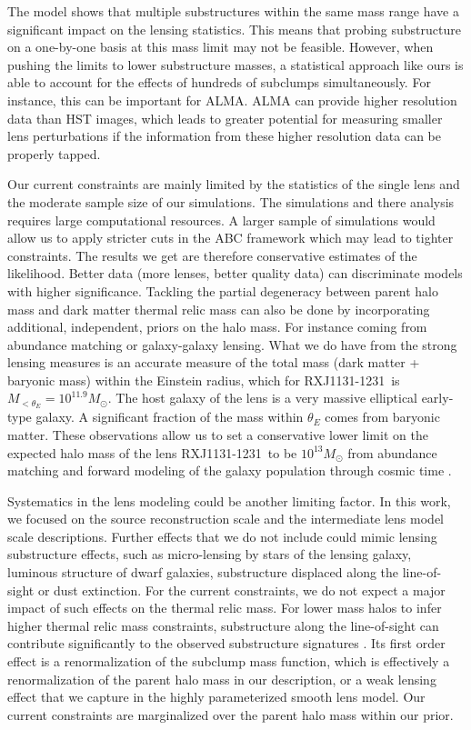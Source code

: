 \documentclass[a4paper,11pt]{article}
\def \RXJ {RXJ1131-1231~}
\begin{document}
The model shows that multiple substructures within the same mass range have a significant impact on the lensing statistics. This means that probing substructure on a one-by-one basis at this mass limit may not be feasible. However, when pushing the limits to lower substructure masses, a statistical approach like ours is able to account for the effects of hundreds of subclumps simultaneously. For instance, this can be important for ALMA. ALMA can provide higher resolution data than HST images, which leads to greater potential for measuring smaller lens perturbations \citep[see e.g.][]{Hezaveh:2016p13593, Dye:2015p10118, Rybak:2015p10769} if the information from these higher resolution data can be properly tapped.


Our current constraints are mainly limited by the statistics of the single lens and the moderate sample size of our simulations. The simulations and there analysis requires large computational resources. A larger sample of simulations would allow us to apply stricter cuts in the ABC framework which may lead to tighter constraints. The results we get are therefore conservative estimates of the likelihood. Better data (more lenses, better quality data) can discriminate models with higher significance. Tackling the partial degeneracy between parent halo mass and dark matter thermal relic mass can also be done by incorporating additional, independent, priors on the halo mass. For instance coming from abundance matching or galaxy-galaxy lensing. What we do have from the strong lensing measures is an accurate measure of the total mass (dark matter + baryonic mass) within the Einstein radius, which for \RXJ is $M_{<\theta_E} = 10^{11.9} M_{\odot}$. The host galaxy of the lens is a very massive elliptical early-type galaxy. A significant fraction of the mass within $\theta_E$ comes from baryonic matter. These observations allow us to set a conservative lower limit on the expected halo mass of the lens \RXJ to be $10^{13}M_{\odot}$ from abundance matching and forward modeling of the galaxy population through cosmic time \citep[e.g.][]{Behroozi:2013p7464, Birrer:2014p11555}.


Systematics in the lens modeling could be another limiting factor. In this work, we focused on the source reconstruction scale and the intermediate lens model scale descriptions. Further effects that we do not include could mimic lensing substructure effects, such as micro-lensing by stars of the lensing galaxy, luminous structure of dwarf galaxies, substructure displaced along the line-of-sight or dust extinction. For the current constraints, we do not expect a major impact of such effects on the thermal relic mass. For lower mass halos to infer higher thermal relic mass constraints, substructure along the line-of-sight can contribute significantly to the observed substructure signatures \cite{Frenk:2016p15215, Inoue:2016p15472}. Its first order effect is a renormalization of the subclump mass function, which is effectively a renormalization of the parent halo mass in our description, or a weak lensing effect that we capture in the highly parameterized smooth lens model. Our current constraints are marginalized over the parent halo mass within our prior.
\end{document}
